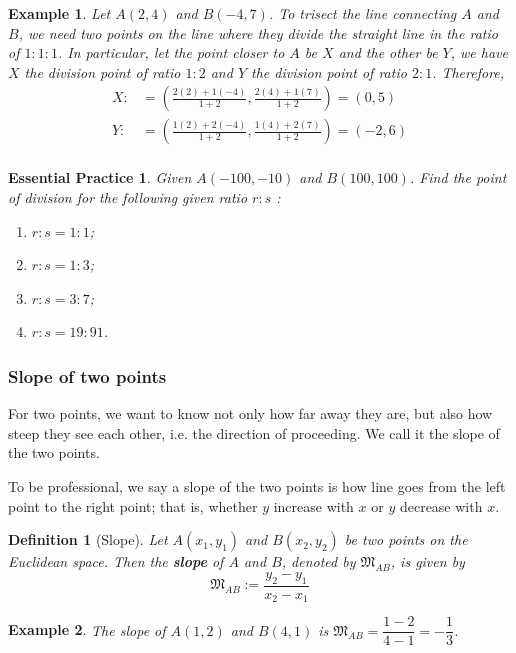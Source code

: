 \documentclass[12pt]{article}
\newtheorem{definition}{Definition}[section]
\newtheorem*{example}{Example}
\newtheorem{exercise}{Essential Practice}[subsection]
\begin{document}
    \begin{example}
        Let $A(2,4)$ and $B(-4,7)$. To trisect the line connecting $A$ and $B$, we need two points on the line where they divide the straight line in the ratio of $1:1:1$. In particular, let the point closer to $A$ be $X$ and the other be $Y$, we have $X$ the division point of ratio $1:2$ and $Y$ the division point of ratio $2:1$. Therefore,\begin{align*}
            X:&=(\frac{2(2)+1(-4)}{1+2}, \frac{2(4)+1(7)}{1+2})=(0,5)\\
            Y:&=(\frac{1(2)+2(-4)}{1+2}, \frac{1(4)+2(7)}{1+2})=(-2,6)\\
        \end{align*}
    \end{example}

    \begin{exercise}
        Given $A(-100,-10)$ and $B(100,100)$. Find the point of division for the following given ratio $r:s$ :\begin{enumerate}
            \item $r:s=1:1$;
            \item $r:s=1:3$;
            \item $r:s=3:7$;
            \item $r:s=19:91$.
        \end{enumerate}
    \end{exercise}

    \subsubsection*{Slope of two points}

    For two points, we want to know not only how far away they are, but also how steep they see each other, i.e. the direction of proceeding. We call it the slope of the two points.

    To be professional, we say a slope of the two points is how line goes from the left point to the right point; that is, whether $y$ increase with $x$ or $y$ decrease with $x$.

    \begin{definition}[Slope]
        Let $A(x_1,y_1)$ and $B(x_2,y_2)$ be two points on the Euclidean space. Then the \textbf{slope} of $A$ and $B$, denoted by $\mathfrak{M}_{AB}$, is given by $$\mathfrak{M}_{AB}:=\frac{y_2-y_1}{x_2-x_1}$$
    \end{definition}

    \begin{example}
        The slope of $A(1,2)$ and $B(4,1)$ is $\mathfrak{M}_{AB}=\dfrac{1-2}{4-1}=-\dfrac{1}{3}$.
    \end{example}
\end{document}
